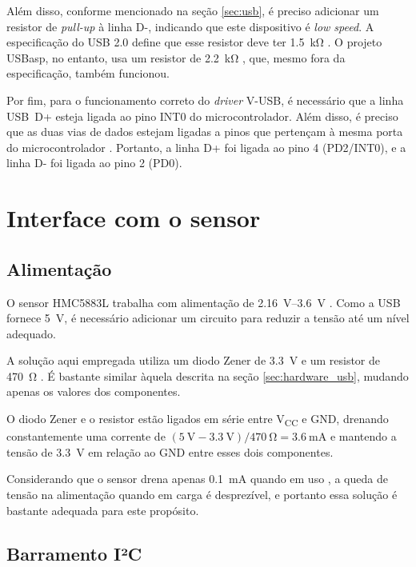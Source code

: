 \documentclass[brazil,pagestart=firstchapter]{abnt}
\newcommand*{\VCC}{V\textsubscript{CC}\xspace}
\newcommand*{\GND}{GND\xspace}
\newcommand*{\VUSB}{\mbox{V-USB}\xspace}
\begin{document}
Além disso, conforme mencionado na seção \ref{sec:usb}, é preciso adicionar
um resistor de \textit{pull-up} à linha D-, indicando que este dispositivo
é \textit{low speed}. A especificação do USB 2.0 define que esse resistor
deve ter \SI{1.5}{\kilo\ohm} \cite{usb20}. O projeto USBasp, no
entanto, usa um resistor de \SI{2.2}{\kilo\ohm} \cite{USBasp}, que, mesmo
fora da especificação, também funcionou.

Por fim, para o funcionamento correto do \textit{driver} \VUSB, é necessário
que a linha USB~D+ esteja ligada ao pino INT0 do microcontrolador. Além
disso, é preciso que as duas vias de dados estejam ligadas a pinos que
pertençam à mesma porta do microcontrolador
\cite{VUSBdriver}. Portanto, a linha D+ foi ligada ao
pino 4 (PD2/INT0), e a linha D- foi ligada ao pino 2 (PD0).


\section{Interface com o sensor}
\label{sec:hardware_sensor}

\subsection{Alimentação}
\label{sub:hardware_sensor_alimentacao}

O sensor HMC5883L trabalha com alimentação de \SIrange{2.16}{3.6}{\volt}
\cite{HMC5883L}. Como a \ac{USB} fornece \SI{5}{\volt}, é necessário
adicionar um circuito para reduzir a tensão até um nível adequado.

A solução aqui empregada utiliza um diodo Zener de \SI{3.3}{\volt} e um
resistor de \SI{470}{\ohm} \cite{3vtipsandtricks}. É bastante similar àquela
descrita na seção \ref{sec:hardware_usb}, mudando apenas os valores dos
componentes.

O diodo Zener e o resistor estão ligados em série entre \VCC e \GND,
drenando constantemente uma corrente de $ (\SI{5}{\volt} - \SI{3.3}{\volt})
/ \SI{470}{\ohm} = \SI{3.6}{\milli\ampere} $ e mantendo a tensão de
\SI{3.3}{\volt} em relação ao \GND entre esses dois componentes.

Considerando que o sensor drena apenas \SI{0.1}{\milli\ampere} quando em
uso \cite{HMC5883L}, a queda de tensão na alimentação quando em carga
é desprezível, e portanto essa solução é bastante adequada para este
propósito.

\subsection{Barramento I²C}
\label{sub:hardware_sensor_i2c}
\end{document}
